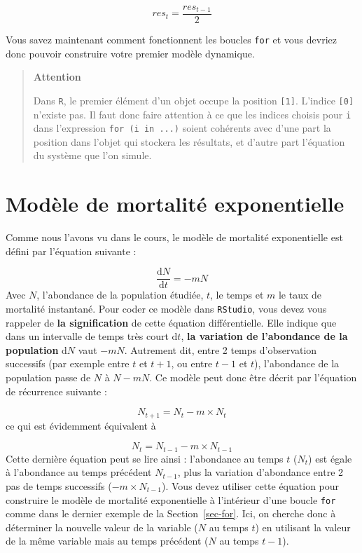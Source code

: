 \documentclass[
  french,
  a4paper,
  DIV=11,
  numbers=noendperiod,
  oneside]{scrreprt}
\begin{document}
\begin{tcolorbox}
\[res_t = \frac{res_{t-1}}{2}\]

Vous savez maintenant comment fonctionnent les boucles \texttt{for} et
vous devriez donc pouvoir construire votre premier modèle dynamique.

\begin{quote}
\textbf{Attention}

Dans \texttt{R}, le premier élément d'un objet occupe la position
\texttt{{[}1{]}}. L'indice \texttt{{[}0{]}} n'existe pas. Il faut donc
faire attention à ce que les indices choisis pour \texttt{i} dans
l'expression \texttt{for\ (i\ in\ ...)} soient cohérents avec d'une part
la position dans l'objet qui stockera les résultats, et d'autre part
l'équation du système que l'on simule.
\end{quote}

\section{Modèle de mortalité exponentielle}\label{sec-mort}

Comme nous l'avons vu dans le cours, le modèle de mortalité
exponentielle est défini par l'équation suivante :

\[\frac{\mathrm{d}N}{\mathrm{d}t} = -mN\] Avec \(N\), l'abondance de la
population étudiée, \(t\), le temps et \(m\) le taux de mortalité
instantané. Pour coder ce modèle dans \texttt{RStudio}, vous devez vous
rappeler de \textbf{la signification} de cette équation différentielle.
Elle indique que dans un intervalle de temps très court \(\mathrm{d}t\),
\textbf{la variation de l'abondance de la population} \(\mathrm{d}N\)
vaut \(-mN\). Autrement dit, entre 2 temps d'observation successifs (par
exemple entre \(t\) et \(t + 1\), ou entre \(t - 1\) et \(t\)),
l'abondance de la population passe de \(N\) à \(N - mN\). Ce modèle peut
donc être décrit par l'équation de récurrence suivante :

\[N_{t+1} = N_t - m \times N_t\] ce qui est évidemment équivalent à

\[N_{t} = N_{t - 1} - m \times N_{t - 1}\] Cette dernière équation peut
se lire ainsi : l'abondance au temps \(t\) (\(N_t\)) est égale à
l'abondance au temps précédent \(N_{t-1}\), plus la variation
d'abondance entre 2 pas de temps successifs (\(-m\times N_{t-1}\)). Vous
devez utiliser cette équation pour construire le modèle de mortalité
exponentielle à l'intérieur d'une boucle \texttt{for} comme dans le
dernier exemple de la Section~\ref{sec-for}. Ici, on cherche donc à
déterminer la nouvelle valeur de la variable (\(N\) au temps \(t\)) en
utilisant la valeur de la même variable mais au temps précédent (\(N\)
au temps \(t-1\)).


\end{tcolorbox}
\end{document}

